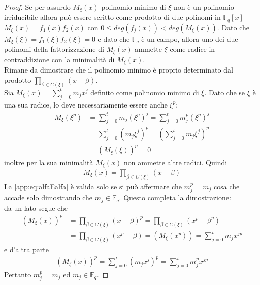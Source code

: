 \begin{proof}
   Se per assurdo $M_{\xi}(x) $ polinomio minimo di $\xi$ non è un polinomio irriducibile allora può essere scritto come prodotto di due polinomi in $\mathbb{F}_{q}[x]$ $M_{\xi}(x) = f_{1}(x) f_{2}(x)$ con $0 \leq deg(f_{j}(x)) < deg(M_{\xi}(x))$. Dato che $M_{\xi}(\xi) = f_{1}(\xi) f_{2}(\xi) = 0 $ e dato che $\mathbb{F}_{q}$ è un campo, allora uno dei due polinomi della fattorizzazione di $M_{\xi}(x)$ ammette $\xi$ come radice in contraddizione con la minimalità di $M_{\xi}(x)$.\\
   Rimane da dimostrare che il polinomio minimo è proprio determinato dal prodotto $ \prod_{\beta \in C(\xi)} (x-\beta)$. \\
   Sia $M_{\xi}(x) = \sum_{j=0}^{t} m_{j}x^{j}$ definito come polinomio minimo di $\xi$. Dato che se $\xi$ è una sua radice, lo deve necessariamente essere anche $\xi^{p}$:
   \begin{align}\label{app:eq:alfaEalfa}
       M_{\xi}(\xi^{p})
       &= \sum_{j=0}^{t} m_{j}(\xi^{p})^{j} = \sum_{j=0}^{t} m_{j}^{p}(\xi^{p})^{j} \\
       &= \sum_{j=0}^{t} (m_{j}\xi^{j})^{p} = (\sum_{j=0}^{t} m_{j}\xi^{j})^{p} \\
       &= (M_{\xi}(\xi))^{p} = 0
   \end{align}
   inoltre per la sua minimalità $M_{\xi}(x)$ non ammette altre radici. Quindi
   \begin{align*}
      M_{\xi}(x) = \prod_{\beta \in C(\xi)} (x-\beta)
   \end{align*}
   La \ref{app:eq:alfaEalfa} è valida solo se si può affermare che $m_{j}^{p} = m_{j}$ cosa che accade solo dimostrando che $m_{j} \in \mathbb{F}_{q}$. Questo completa la dimostrazione: \\
   da un lato segue che
   \begin{align*}
       (M_{\xi}(x))^{p}
       &= \prod_{\beta \in C(\xi)} (x-\beta)^{p} = \prod_{\beta \in C(\xi)} (x^{p} -\beta^{p}) \\
       &= \prod_{\beta \in C(\xi)} (x^{p} -\beta) = (M_{\xi}(x^{p})) = \sum_{j=0}^{t} m_{j}x^{jp}
   \end{align*}
   e d'altra parte
   \begin{align*}
       (M_{\xi}(x))^{p} =  \sum_{j=0}^{t} (m_{j}x^{j})^{p} =  \sum_{j=0}^{t} m_{j}^{p}x^{jp}
   \end{align*}
   Pertanto $m_{j}^{p} = m_{j}$ ed $m_{j} \in  \mathbb{F}_{q}$.
\end{proof}

